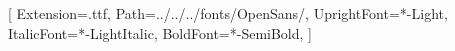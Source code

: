 \newcommand{\heightabstract}[1]{\def\@heightabstract{#1}}
\newcommand{\widthaffil}[1]{\def\@widthaffil{#1}}

\newcommand{\rolling}[1]{\def\@rolling{#1}}
\newcommand{\subtitle}[1]{\def\@subtitle{#1}}


\newcommand{\runningauthor}[1]{\def\@runningauthor{#1}}
\newcommand{\corraddress}[1]{\def\@corraddress{#1}}
\newcommand{\corremail}[1]{\def\@corremail{#1}}

\newcommand{\rgainfo}[1]{\def\@rgainfo{#1}}

\newcommand{\fundinginfo}[1]{\def\@fundinginfo{#1}}

\newcommand{\paperdoi}[1]{\def\@paperdoi{#1}}
\newcommand{\paperreceived}[1]{\def\@paperreceived{#1}}
\newcommand{\paperrevised}[1]{\def\@paperrevised{#1}}
\newcommand{\paperaccepted}[1]{\def\@paperaccepted{#1}}

\newcommand{\paperpublished}[1]{\def\@paperpublished{#1}}
\newcommand{\paperissued}[1]{\def\@paperissued{#1}}
\newcommand{\paperpublisheddate}[1]{\def\@paperpublisheddate{#1}}
\newcommand{\papereditor}[1]{\def\@papereditor{#1}}
\newcommand{\papertype}[1]{\def\@papertype{#1}}
\newcommand{\paperfield}[1]{\def\@paperfield{#1}}

\newcommand{\funding}[1]{\def\@funding{#1}}
\newcommand{\acknowledgments}[1]{\def\@acknowledgments{#1}}
\newcommand{\contributions}[1]{\def\@contributions{#1}}
\newcommand{\interests}[1]{\def\@interests{#1}}

\newcommand{\keywordsabstract}[1]{\def\@keywordsabstract{#1}}
\newcommand{\noabstract}[1]{\def\@noabstract{#1}}
\newcommand{\authorone}[1]{\def\@authorone{#1}}
\newcommand{\authortwo}[1]{\def\@authortwo{#1}}
\newcommand{\authorthree}[1]{\def\@authorthree{#1}}
\newcommand{\authorfour}[1]{\def\@authorfour{#1}}
\newcommand{\authorfive}[1]{\def\@authorfive{#1}}
\newcommand{\ogauthor}[1]{\def\@ogauthor{#1}}
\newcommand{\prround}[1]{\def\@prround{#1}}

\newcommand{\bigspace}{3\baselineskip}

\RequirePackage{amssymb}
\newcommand{\jotepre}{{\huge$\blacksquare\kern-.2em\blacksquare$}}



\setmainfont{OpenSans}[
    Extension={.ttf},
    Path={../../../fonts/OpenSans/},
    UprightFont={*-Light},
    ItalicFont={*-LightItalic},
    BoldFont={*-SemiBold},
]

